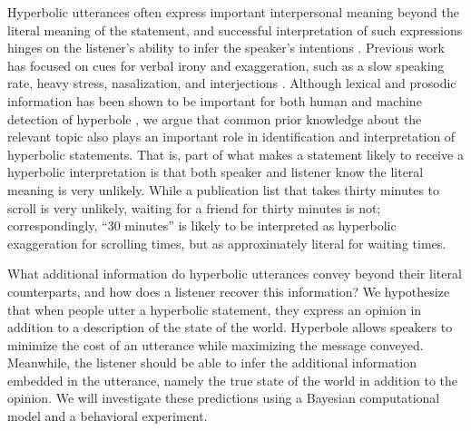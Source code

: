 \documentclass{article} %
\begin{document}
Hyperbolic utterances often express important interpersonal meaning beyond the literal meaning of the statement, and successful interpretation of such expressions hinges on the listener's ability to infer the speaker's intentions \cite{mccarthy2004there, gibbs2000irony, cano2003risk}. Previous work has focused on cues for verbal irony and exaggeration, such as a slow speaking rate, heavy stress, nasalization, and interjections \cite{kreuz1995two, kreuz2007lexical}. Although lexical and prosodic information has been shown to be important for both human and machine detection of hyperbole \cite{davidov2010semi, reyes2011mining, van2007algorithm}, we argue that common prior knowledge about the relevant topic
also plays an important role in identification and interpretation of hyperbolic statements. That is, part of what makes a statement likely to receive a hyperbolic interpretation is that both speaker and listener know the literal meaning is very unlikely. 
While a publication list that takes thirty minutes to scroll is very unlikely, waiting for a friend for thirty minutes is not; correspondingly, ``30 minutes'' is likely to be interpreted as hyperbolic exaggeration for scrolling times, but as approximately literal for waiting times.

What additional information do hyperbolic utterances convey beyond their literal counterparts, and how does a listener recover this information? We hypothesize that when people utter a hyperbolic statement, they express an opinion in addition to a description of the state of the world. Hyperbole allows speakers to minimize the cost of an utterance while maximizing the message conveyed. Meanwhile, the listener should be able to infer the additional information embedded in the utterance, namely the true state of the world in addition to the opinion. We will investigate these predictions using a Bayesian computational model and a behavioral experiment. 
\end{document}
